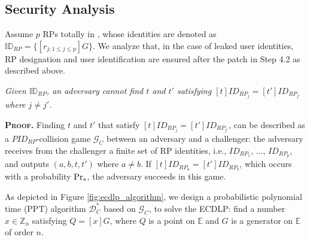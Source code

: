 \subsection{Security Analysis}
\label{proof-rp-collision}

Assume $p$ RPs totally in \usso,
    whose identities are denoted as $\mathbb{ID}_{RP} = \{[r_{j; 1 \leq j \leq p}]G\}$.
We analyze that, in the case of leaked user identities,
    RP designation and user identification are ensured after the patch in Step 4.2 as described above.

\begin{lemma}
\emph{Given $\mathbb{ID}_{RP}$, an adversary cannot find $t$ and $t'$ satisfying $[t]ID_{RP_j} = [t']ID_{RP_{j'}}$ where $j \neq j'$.}\label{thm-rp-collision}
\end{lemma}

\noindent\textbf{\textsc{Proof.}} 
Finding $t$ and $t'$ that satisfy $[t]ID_{RP_j} = [t']ID_{RP_{j'}}$, can be described as a $PID_{RP}$-collision game $\mathcal{G}_C$ between an adversary and a challenger: the adversary receives from the challenger a finite set of RP identities, i.e., $ID_{RP_1}$, ..., $ID_{RP_p}$, and outputs $(a, b, t, t')$ where $a \neq b$. If $[t]ID_{RP_a}=[t']ID_{RP_b}$, which occurs with a probability ${\rm Pr}_s$, the adversary succeeds in this game.

As depicted in Figure \ref{fig:ecdlp_algorithm}, we design a probabilistic polynomial time (PPT) algorithm $\mathcal{D}^*_C$ based on $\mathcal{G}_C$, to solve the ECDLP: find a number $x \in \mathbb{Z}_n$ satisfying $Q = [x]G$, where $Q$ is a point on $\mathbb{E}$ and $G$ is a generator on $\mathbb{E}$ of order $n$.


